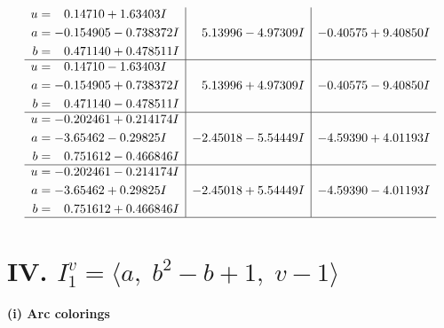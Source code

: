 \documentclass[1p]{elsarticle_modified}
\theoremstyle{definition}
\begin{document}
$$\begin{array}{c|c|c}
\begin{aligned}
u &= \phantom{-}0.14710 + 1.63403 I \\
a &= -0.154905 - 0.738372 I \\
b &= \phantom{-}0.471140 + 0.478511 I\end{aligned}
 & \phantom{-}5.13996 - 4.97309 I & -0.40575 + 9.40850 I \\ \hline\begin{aligned}
u &= \phantom{-}0.14710 - 1.63403 I \\
a &= -0.154905 + 0.738372 I \\
b &= \phantom{-}0.471140 - 0.478511 I\end{aligned}
 & \phantom{-}5.13996 + 4.97309 I & -0.40575 - 9.40850 I \\ \hline\begin{aligned}
u &= -0.202461 + 0.214174 I \\
a &= -3.65462 - 0.29825 I \\
b &= \phantom{-}0.751612 - 0.466846 I\end{aligned}
 & -2.45018 - 5.54449 I & -4.59390 + 4.01193 I \\ \hline\begin{aligned}
u &= -0.202461 - 0.214174 I \\
a &= -3.65462 + 0.29825 I \\
b &= \phantom{-}0.751612 + 0.466846 I\end{aligned}
 & -2.45018 + 5.54449 I & -4.59390 - 4.01193 I\\
 \hline 
 \end{array}$$\newpage\newpage\renewcommand{\arraystretch}{1}
\centering \section*{IV. $I^v_{1}= \langle a,\;b^2- b+1,\;v-1 \rangle$}
\flushleft \textbf{(i) Arc colorings}\\
\end{document}
